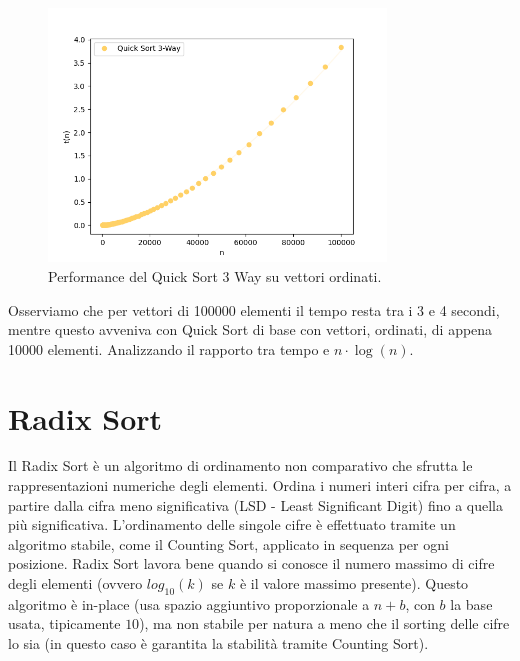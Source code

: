 \documentclass[a4paper, 12pt, oneside]{book}
\begin{document}
\begin{figure}[H]
    \centering
    \includegraphics[width=0.8\textwidth]{images/quicksort3wayCasoPeggiore.png}
    \caption{Performance del Quick Sort 3 Way su vettori ordinati.}
    \label{fig:quick_sort_3_way_m}
\end{figure}

\noindent
Osserviamo che per vettori di 100000 elementi il tempo resta tra i 3 e 4 secondi, mentre questo avveniva con Quick Sort di base con vettori, ordinati, di appena 10000 elementi. Analizzando il rapporto tra tempo e $n \cdot \log (n)$.




\chapter{Radix Sort}\label{chap:Radix Sort} %

Il Radix Sort è un algoritmo di ordinamento non comparativo che sfrutta le rappresentazioni numeriche degli elementi. Ordina i numeri interi cifra per cifra, a partire dalla cifra meno significativa (LSD - Least Significant Digit) fino a quella più significativa. L'ordinamento delle singole cifre è effettuato tramite un algoritmo stabile, come il Counting Sort, applicato in sequenza per ogni posizione.
Radix Sort lavora bene quando si conosce il numero massimo di cifre degli elementi (ovvero \(log_{10}(k)\) se \(k\) è il valore massimo presente).
Questo algoritmo è in-place (usa spazio aggiuntivo proporzionale a \(n + b\), con \(b\) la base usata, tipicamente \(10\)), ma non stabile per natura a meno che il sorting delle cifre lo sia (in questo caso è garantita la stabilità tramite Counting Sort).
\end{document}
